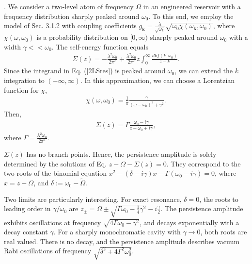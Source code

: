 \documentclass[12pt]{article}
\numberwithin{equation}{section}
\begin{document}
\begin{appendix}
\bigskip
{}. We consider a  two-level atom  of frequency $\Omega$ in an engineered reservoir with a frequency distribution sharply peaked around $\omega_0$. To this end, we employ the model of Sec. 3.1.2 with coupling coefficients $g_{\pmb k} = \frac{\lambda}{\sqrt{\omega_k}} \sqrt{\omega_0 \chi(\omega_{\pmb k}, \omega_0)}$, where $\chi(\omega, \omega_0)$ is a probability distribution on $[0, \infty)$ sharply peaked around $\omega_0$ with a width $\gamma << \omega_0$. The self-energy function equals
\begin{eqnarray}
\Sigma(z) = -\frac{\lambda^2 \omega_0}{2 \pi^2} + \frac{\lambda^2 \omega_0}{2 \pi^2}z \int_{0}^{\infty} \frac{dk f(k, \omega_0)}{z- k}. \label{2LSres}
\end{eqnarray}
Since the integrand in Eq. (\ref{2LSres}) is peaked around $\omega_0$, we can extend the $k$ integration to $(-\infty, \infty)$. In  this approximation, we can choose a Lorentzian function for $\chi$,
\begin{eqnarray}
\chi(\omega, \omega_0) = \frac{1}{\pi} \frac{\gamma}{(\omega-\omega_0)^2 + \gamma^2}.
\end{eqnarray}
Then, 
\begin{eqnarray}
\Sigma(z) = \Gamma \frac{\omega_0- i \gamma}{z - \omega_0 + i \gamma},
\end{eqnarray}
where $\Gamma = \frac{\lambda^2 \omega_0}{2 \pi^2}$.

 $\Sigma(z)$ has no branch points. Hence, the persistence amplitude is solely determined by the solutions of Eq. $z - \Omega- \Sigma(z) = 0$. They correspond to the two roots of the binomial equation $x^2 - (\delta - i \gamma) x - \Gamma (\omega_0 - i \gamma) = 0$, where $x = z - \Omega$,  and
 $\delta := \omega_0 - \tilde{\Omega}$. 
 
 Two limits are particularly interesting. For exact resonance, $\delta = 0$, the roots to leading order in $\gamma/\omega_0$ are $z_{\pm} = \Omega \pm \sqrt{\Gamma \omega_0 - \frac{1}{4}\gamma^2} - i \frac{\gamma}{2}$. The persistence amplitude exhibits oscillations at frequency $\sqrt{4 \Gamma \omega_0 - \gamma^2}$, and decays exponentially with a decay constant $\gamma$. 
 For a sharply monochromatic cavity with $\gamma \rightarrow 0$, both roots are real valued. There is no decay, and the persistence amplitude describes vacuum Rabi oscillations of frequency $\sqrt{\delta^2 + 4 \Gamma^2 \omega_0^2}$.



\end{appendix}
\end{document}
